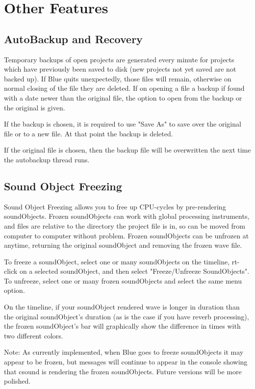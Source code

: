 \section{Other Features}\label{otherFeatures}

\subsection{AutoBackup and Recovery}\label{autoBackup}

Temporary backups of open projects are generated every minute for
projects which have previously been saved to disk (new projects not yet
saved are not backed up). If Blue quits unexpectedly, those files will
remain, otherwise on normal closing of the file they are deleted. If on
opening a file a backup if found with a date newer than the original
file, the option to open from the backup or the original is given.

If the backup is chosen, it is required to use "Save As" to save over
the original file or to a new file. At that point the backup is deleted.

If the original file is chosen, then the backup file will be overwritten
the next time the autobackup thread runs.

\subsection{Sound Object Freezing}\label{soundObjectFreezing}

Sound Object Freezing allows you to free up CPU-cycles by pre-rendering
soundObjects. Frozen soundObjects can work with global processing
instruments, and files are relative to the directory the project file is
in, so can be moved from computer to computer without problem. Frozen
soundObjects can be unfrozen at anytime, returning the original
soundObject and removing the frozen wave file.

To freeze a soundObject, select one or many soundObjects on the
timeline, rt-click on a selected soundObject, and then select
"Freeze/Unfreeze SoundObjects". To unfreeze, select one or many frozen
soundObjects and select the same menu option.

On the timeline, if your soundObject rendered wave is longer in duration
than the original soundObject's duration (as is the case if you have
reverb processing), the frozen soundObject's bar will graphically show
the difference in times with two different colors.

Note: As currently implemented, when Blue goes to freeze soundObjects it
may appear to be frozen, but messages will continue to appear in the
console showing that csound is rendering the frozen soundObjects. Future
versions will be more polished.

